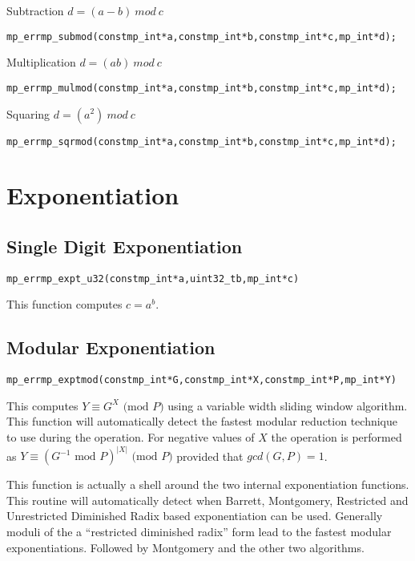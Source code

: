 \documentclass[synpaper]{book}
\def\mod{{\mathit\ mod\ }}
\begin{document}
Subtraction  $d = (a - b) \mod c$
\begin{alltt}
mp_err mp_submod(const mp_int *a, const mp_int *b, const mp_int *c, mp_int *d);
\end{alltt}

Multiplication $d = (ab) \mod c$
\begin{alltt}
mp_err mp_mulmod(const mp_int *a, const mp_int *b, const mp_int *c, mp_int *d);
\end{alltt}

Squaring  $d = (a^2) \mod c$
\begin{alltt}
mp_err mp_sqrmod(const mp_int *a, const mp_int *b, const mp_int *c, mp_int *d);
\end{alltt}



\chapter{Exponentiation}
\section{Single Digit Exponentiation}
\begin{alltt}
mp_err mp_expt_u32 (const mp_int *a, uint32_t b, mp_int *c)
\end{alltt}
This function computes $c = a^b$.

\section{Modular Exponentiation}
\begin{alltt}
mp_err mp_exptmod (const mp_int *G, const mp_int *X, const mp_int *P, mp_int *Y)
\end{alltt}
This computes $Y \equiv G^X \mbox{ (mod }P\mbox{)}$ using a variable width sliding window algorithm.  This function
will automatically detect the fastest modular reduction technique to use during the operation.  For negative values of
$X$ the operation is performed as $Y \equiv (G^{-1} \mbox{ mod }P)^{\vert X \vert} \mbox{ (mod }P\mbox{)}$ provided that
$gcd(G, P) = 1$.

This function is actually a shell around the two internal exponentiation functions.  This routine will automatically
detect when Barrett, Montgomery, Restricted and Unrestricted Diminished Radix based exponentiation can be used.  Generally
moduli of the a ``restricted diminished radix'' form lead to the fastest modular exponentiations.  Followed by Montgomery
and the other two algorithms.
\end{document}

